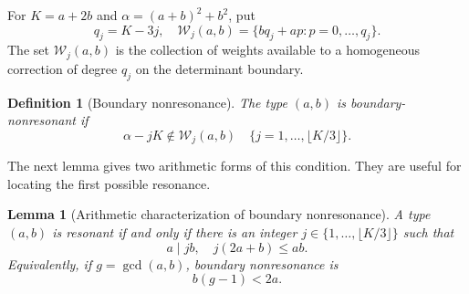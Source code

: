 \documentclass[12pt,a4paper]{article}
\theoremstyle{plain}
\newtheorem{lemma}{Lemma}
\newtheorem{definition}{Definition}
\theoremstyle{definition}
\begin{document}
For $K=a+2b$ and $\alpha=(a+b)^2+b^2$, put
\begin{equation*}
    q_j=K-3j
    ,
    \quad
    \mathcal{W}_j(a,b)=\{bq_j+ap:p=0,\ldots,q_j\}
    .
\end{equation*}
The set $\mathcal{W}_j(a,b)$ is the collection of weights available to a homogeneous correction of degree $q_j$ on the determinant boundary.

\begin{definition}[Boundary nonresonance]
\label{def:nonresonance}
    The type $(a,b)$ is boundary-nonresonant if
    \begin{equation}
    \label{eq:NR}
        \alpha-jK\notin\mathcal{W}_j(a,b)
        \quad
        \{j=1,\ldots,\lfloor K/3\rfloor\}
        .
    \end{equation}
\end{definition}

The next lemma gives two arithmetic forms of this condition.
They are useful for locating the first possible resonance.

\begin{lemma}[Arithmetic characterization of boundary nonresonance]
\label{lem:nonresonance-arithmetic}
    A type $(a,b)$ is resonant if and only if there is an integer $j\in\{1,\ldots,\lfloor K/3\rfloor\}$ such that
    \begin{equation}
    \label{eq:NR-arith}
        a\mid jb
        ,
        \quad
        j(2a+b)\le ab
        .
    \end{equation}
    Equivalently, if $g=\gcd(a,b)$, boundary nonresonance is
    \begin{equation}
    \label{eq:NR-gcd}
        b(g-1)<2a
        .
    \end{equation}
\end{lemma}
\end{document}
